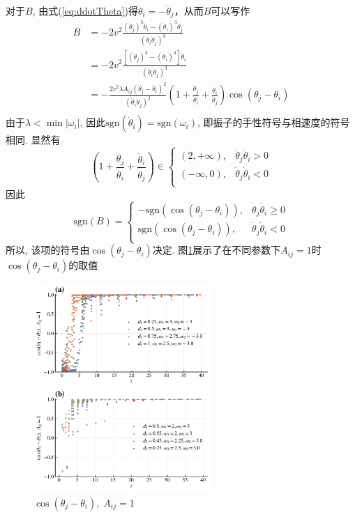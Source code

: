 \documentclass{article}
\begin{document}
对于$B$, 由式(\ref{eq:ddotTheta})得$\ddot{\theta}_i=-\ddot{\theta}_j$，从而$B$可以写作
$$
\begin{aligned}
	B&=-2v^2\frac{\left( \dot{\theta}_j \right) ^3\ddot{\theta}_i-\left( \dot{\theta}_i \right) ^3\ddot{\theta}_j}{\left( \dot{\theta}_i\dot{\theta}_j \right) ^3}\\
	&=-2v^2\frac{\left[ \left( \dot{\theta}_j \right) ^3-\left( \dot{\theta}_i \right) ^3 \right] \ddot{\theta}_i}{\left( \dot{\theta}_i\dot{\theta}_j \right) ^3}\\
	&=-\frac{2v^2\lambda A_{ij}\left( \dot{\theta}_j-\dot{\theta}_i \right) ^2}{\left( \dot{\theta}_i\dot{\theta}_j \right) ^2}\left( 1+\frac{\dot{\theta}_j}{\dot{\theta}_i}+\frac{\dot{\theta}_i}{\dot{\theta}_j} \right) \cos \left( \theta _j-\theta _i \right)\\
\end{aligned}
$$
由于$\lambda<\min|\omega_i|$, 因此$\text{sgn} (\dot{\theta}_i)=\text{sgn}(\omega_i)$, 即振子的手性符号与相速度的符号相同.
显然有
$$
\left( 1+\frac{\dot{\theta}_j}{\dot{\theta}_i}+\frac{\dot{\theta}_i}{\dot{\theta}_j} \right) \in \begin{cases}
	\left( 2,+\infty \right) ,&		\dot{\theta}_j\dot{\theta}_i>0\\
	\left( -\infty , 0 \right) ,&		\dot{\theta}_j\dot{\theta}_i<0\\
\end{cases}
$$
因此
$$
\text{sgn} \left( B \right) =\begin{cases}
	-\text{sgn} \left( \cos \left( \theta _j-\theta _i \right) \right) ,&		\dot{\theta}_j\dot{\theta}_i\geqslant 0\\
	\text{sgn} \left( \cos \left( \theta _j-\theta _i \right) \right), &		\dot{\theta}_j\dot{\theta}_i<0\\
\end{cases}
$$
所以, 该项的符号由$\cos \left( \theta _j-\theta _i \right)$决定. 图\ref{fig:2OsCosDeltaTheta}展示了在不同参数下$A_{ij}=1$时$\cos \left( \theta _j-\theta _i \right)$的取值

\begin{figure}[H]
    \centering
    \includegraphics[width=0.6\textwidth]{./figs/2OsCosDeltaTheta.pdf}
    \caption{$\cos \left( \theta _j-\theta _i \right),\;A_{ij}=1$}
    \label{fig:2OsCosDeltaTheta}
\end{figure}
\end{document}
